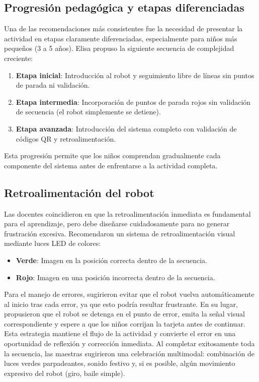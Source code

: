 \documentclass{prgrado}
\begin{document}
\subsection{Progresión pedagógica y etapas diferenciadas}
Una de las recomendaciones más consistentes fue la necesidad de presentar la actividad en etapas claramente diferenciadas, especialmente para niños más pequeños (3 a 5 años). Elisa propuso la siguiente secuencia de complejidad creciente:
\begin{enumerate}
\item \textbf{Etapa inicial}: Introducción al robot y seguimiento libre de líneas sin puntos de parada ni validación.
\item \textbf{Etapa intermedia}: Incorporación de puntos de parada rojos sin validación de secuencia (el robot simplemente se detiene).
\item \textbf{Etapa avanzada}: Introducción del sistema completo con validación de códigos QR y retroalimentación.
\end{enumerate}
Esta progresión permite que los niños comprendan gradualmente cada componente del sistema antes de enfrentarse a la actividad completa.
\subsection{Retroalimentación del robot}
Las docentes coincidieron en que la retroalimentación inmediata es fundamental para el aprendizaje, pero debe diseñarse cuidadosamente para no generar frustración excesiva. Recomendaron un sistema de retroalimentación visual mediante luces LED de colores:
\begin{itemize}
\item \textbf{Verde}: Imagen en la posición correcta dentro de la secuencia.
\item \textbf{Rojo}: Imagen en una posición incorrecta dentro de la secuencia.
\end{itemize}
Para el manejo de errores, sugirieron evitar que el robot vuelva automáticamente al inicio tras cada error, ya que esto podría resultar frustrante. En su lugar, propusieron que el robot se detenga en el punto de error, emita la señal visual correspondiente y espere a que los niños corrijan la tarjeta antes de continuar. Esta estrategia mantiene el flujo de la actividad y convierte el error en una oportunidad de reflexión y corrección inmediata.
Al completar exitosamente toda la secuencia, las maestras sugirieron una celebración multimodal: combinación de luces verdes parpadeantes, sonido festivo y, si es posible, algún movimiento expresivo del robot (giro, baile simple).
\end{document}
